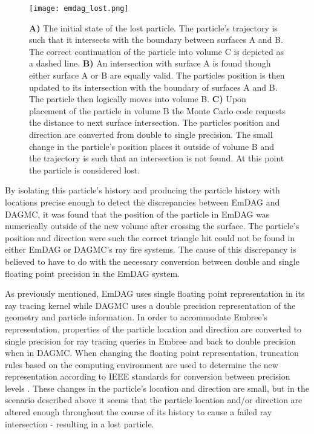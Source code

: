 \begin{figure}[h!]
  \begin{centering}
    \texttt{[image: emdag\_lost.png]}
    \caption[Graphic representation of lost particles.]{\textbf{A)} The initial
      state of the lost particle. The particle's trajectory is such that it
      intersects with the boundary between surfaces A and B. The correct
      continuation of the particle into volume C is depicted as a dashed
      line. \textbf{B)} An intersection with surface A is found though either
      surface A or B are equally valid. The particles position is then updated
      to its intersection with the boundary of surfaces A and B. The particle
      then logically moves into volume B. \textbf{C)} Upon placement of the
      particle in volume B the Monte Carlo code requests the distance to next
      surface intersection. The particles position and direction are converted
      from double to single precision. The small change in the particle's
      position places it outside of volume B and the trajectory is such that an
      intersection is not found. At this point the particle is considered lost.}
    \label{emdag-lost-particles}
  \end{centering}
  \end{figure}

By isolating this particle's history and producing the particle history with
locations precise enough to detect the discrepancies between EmDAG and DAGMC, it
was found that the position of the particle in EmDAG was numerically outside of
the new volume after crossing the surface. The particle's position and direction
were such the correct triangle hit could not be found in either EmDAG or DAGMC's
ray fire systems. The cause of this discrepancy is believed to have to do with
the necessary conversion between double and single floating point precision in
the EmDAG system.

As previously mentioned, EmDAG uses single floating point representation in its ray
tracing kernel while DAGMC uses a double precision representation of the
geometry and particle information. In order to accommodate Embree's
representation, properties of the particle location and direction are converted
to single precision for ray tracing queries in Embree and back to double
precision when in DAGMC. When changing the floating point representation,
truncation rules based on the computing environment are used to determine the new
representation according to IEEE standards for conversion between precision
levels \cite{IEEE_STD_2008}. These changes in the particle's location and
direction are small, but in the scenario described above it seems that the
particle location and/or direction are altered enough throughout the course of
its history to cause a failed ray intersection - resulting in a lost particle.

